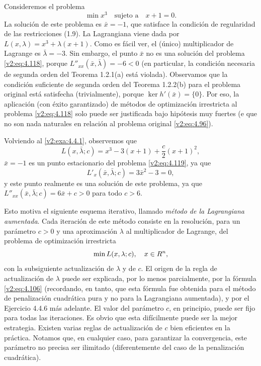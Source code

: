 \begin{example}\label{v2:exa:4.4.1}
    Consideremos el problema
    \[
        \min x^3 \quad \text{sujeto a} \quad x + 1 = 0.
    \]
    La solución de este problema es $\bar{x} = -1$, que satisface la condición de regularidad de las restricciones (1.9). La Lagrangiana viene dada por $L(x, \lambda) = x^3 + \lambda(x + 1)$. Como es fácil ver, el (único) multiplicador de Lagrange es $\bar{\lambda} = -3$. Sin embargo, el punto $\bar{x}$ no es una solución del problema \eqref{v2:eq:4.118}, porque $L''_{xx}(\bar{x}, \bar{\lambda}) = -6 < 0$ (en particular, la condición necesaria de segunda orden del Teorema 1.2.1(a) está violada).
    Observamos que la condición suficiente de segunda orden del Teorema 1.2.2(b) para el problema original está satisfecha (trivialmente), porque $\ker h'(\bar{x}) = \{0\}$.
    Por eso, la aplicación (con éxito garantizado) de métodos de optimización irrestricta al problema \eqref{v2:eq:4.118} solo puede ser justificada bajo hipótesis muy fuertes (e que no son nada naturales en relación al problema original \eqref{v2:eq:4.96}).

    Volviendo al \cref{v2:exa:4.4.1}, observemos que
    \[
        L(x, \bar{\lambda}; c) = x^3 - 3(x + 1) + \frac{c}{2}(x + 1)^2,
    \]
    $\bar{x} = -1$ es un punto estacionario del problema \eqref{v2:eq:4.119}, ya que
    \[
        L'_x(\bar{x}, \bar{\lambda}; c) = 3\bar{x}^2 - 3 = 0,
    \]
    y este punto realmente es una solución de este problema, ya que $L''_{xx}(\bar{x}, \bar{\lambda}; c) = 6\bar{x} + c > 0$ para todo $c > 6$.
\end{example}

Esto motiva el siguiente esquema iterativo, llamado \textit{método de la Lagrangiana aumentada}. Cada iteración de este método consiste en la resolución, para un parámetro $c > 0$ y una aproximación $\lambda$ al multiplicador de Lagrange, del problema de optimización irrestricta
\begin{equation}
    \min L(x, \lambda; c), \quad x \in R^n,
    \label{v2:eq:4.120}
\end{equation}
con la subsiguiente actualización de $\lambda$ y de $c$. El origen de la regla de actualización de $\lambda$ puede ser explicada, por lo menos parcialmente, por la fórmula \eqref{v2:eq:4.106} (recordando, en tanto, que esta fórmula fue obtenida para el método de penalización cuadrática pura y no para la Lagrangiana aumentada), y por el Ejercicio 4.4.6 más adelante. El valor del parámetro $c$, en principio, puede ser fijo para todas las iteraciones. Es obvio que esta difícilmente puede ser la mejor estrategia. Existen varias reglas de actualización de $c$ bien eficientes en la práctica. Notamos que, en cualquier caso, para garantizar la convergencia, este parámetro no precisa ser ilimitado (diferentemente del caso de la penalización cuadrática).

